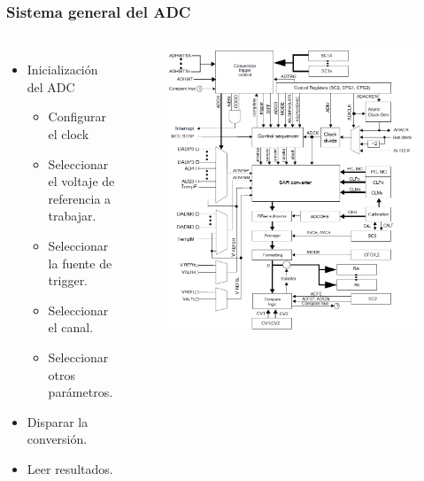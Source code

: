 \documentclass[10.5pt,scale=1.0,t,aspectratio=169,hyperref={pdfpagelabels=false}]{beamer}
\begin{document}
\begin{frame}[fragile]
	\frametitle{Sistema general del ADC}
	{\small
		\begin{columns}
			\begin{itemize}
				\item Inicialización del ADC
				\begin{itemize}
					\item Configurar el clock
					\item Seleccionar el voltaje de referencia a trabajar.
					\item Seleccionar la fuente de trigger.
					\item Seleccionar el canal.
					\item Seleccionar otros parámetros.
				\end{itemize}
				\item Disparar la conversión.
				\item Leer resultados. 
			\end{itemize}
			
			\begin{figure}
				\centering
				\includegraphics[scale=0.4]{fig_SAR}
			\end{figure}
		\end{columns}
	}
\end{frame}
\end{document}
